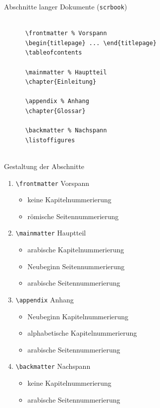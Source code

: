 \begin{Frame}[fragile]{Abschnitte langer Dokumente (\lstinline-scrbook-)}
  \begin{lstlisting}[gobble=4]
    
      \frontmatter % Vorspann
      \begin{titlepage} ... \end{titlepage}
      \tableofcontents

      \mainmatter % Hauptteil
      \chapter{Einleitung}

      \appendix % Anhang
      \chapter{Glossar}
      
      \backmatter % Nachspann
      \listoffigures
    
  \end{lstlisting}
\end{Frame}

\begin{Frame}[fragile]{Gestaltung der Abschnitte}
  \begin{enumerate}
    \item \lstinline-\frontmatter- Vorspann \begin{itemize}
        \item keine Kapitelnummerierung
        \item römische Seitennummerierung
      \end{itemize}
    \pause
    \item \lstinline-\mainmatter- Hauptteil \begin{itemize}
        \item arabische Kapitelnummerierung
        \item Neubeginn Seitennummerierung
        \item arabische Seitennummerierung
      \end{itemize}
    \pause
    \item \lstinline-\appendix- Anhang \begin{itemize}
        \item Neubeginn Kapitelnummerierung
        \item alphabetische Kapitelnummerierung
        \item arabische Seitennummerierung
      \end{itemize}
    \pause
    \item \lstinline-\backmatter- Nachspann \begin{itemize}
        \item keine Kapitelnummerierung
        \item arabische Seitennummerierung
      \end{itemize}
  \end{enumerate}
\end{Frame}

